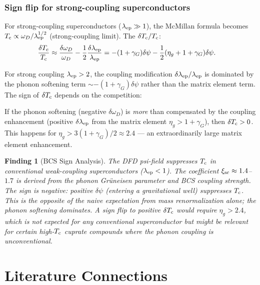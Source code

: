 \documentclass[11pt]{article}
\newtheorem{finding}{Finding}[section]
\theoremstyle{definition}
\theoremstyle{remark}
\newcommand{\Tc}{T_{\rm c}}
\begin{document}
\subsubsection{Sign flip for strong-coupling superconductors}

For strong-coupling superconductors ($\lambda_{\rm ep} \gg 1$), the
McMillan formula becomes $\Tc \propto \omega_D/\lambda_{\rm ep}^{1/2}$
(strong-coupling limit). The $\delta\Tc/\Tc$:
\begin{align}
\frac{\delta\Tc}{\Tc} &\approx \frac{\delta\omega_D}{\omega_D}
- \frac{1}{2}\frac{\delta\lambda_{\rm ep}}{\lambda_{\rm ep}}
= -(1+\gamma_G)\delta\psi - \frac{1}{2}(\eta_g + 1+\gamma_G)\delta\psi.
\end{align}

For strong coupling $\lambda_{\rm ep} > 2$, the coupling modification
$\delta\lambda_{\rm ep}/\lambda_{\rm ep}$ is dominated by the phonon
softening term $\sim -(1+\gamma_G)\delta\psi$ rather than the matrix
element term. The sign of $\delta\Tc$ depends on the competition:

If the phonon softening (negative $\delta\omega_D$) is \emph{more} than
compensated by the coupling enhancement (positive $\delta\lambda_{\rm ep}$
from the matrix element $\eta_g > 1+\gamma_G$), then $\delta\Tc > 0$.
This happens for $\eta_g > 3(1+\gamma_G)/2 \approx 2.4$ --- an
extraordinarily large matrix element enhancement.

\begin{finding}[BCS Sign Analysis]
The DFD psi-field suppresses $\Tc$ in conventional weak-coupling
superconductors ($\lambda_{\rm ep} < 1$). The coefficient $\xi_{\rm sc}
\approx 1.4$--$1.7$ is derived from the phonon Gr\"{u}neisen parameter
and BCS coupling strength. \emph{The sign is negative: positive $\delta\psi$
(entering a gravitational well) suppresses $\Tc$.} This is the opposite
of the naive expectation from mass renormalization alone; the phonon
softening dominates. A sign flip to positive $\delta\Tc$ would require
$\eta_g > 2.4$, which is not expected for any conventional superconductor
but might be relevant for certain high-$\Tc$ cuprate compounds where
the phonon coupling is unconventional.
\end{finding}

\section{Literature Connections}
\label{sec:literature}
\end{document}
